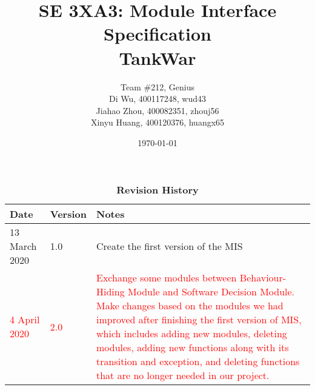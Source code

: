 \documentclass[12pt, titlepage]{article}
\title{SE 3XA3: Module Interface Specification\\TankWar}
\author{Team \#212, Genius
		\\Di Wu, 400117248, wud43 
		\\Jiahao Zhou, 400082351, zhouj56 
		\\Xinyu Huang, 400120376, huangx65
}
\date{\today}
\begin{document}
\maketitle

\tableofcontents
\listoftables
\listoffigures

\begin{table}[bp]
\caption{\bf Revision History}
\begin{tabularx}{\textwidth}{p{3cm}p{2cm}X}
\toprule {\bf Date} & {\bf Version} & {\bf Notes}\\
\midrule
13 March 2020 & 1.0 & Create the first version of the MIS\\
\textcolor{red}{4 April 2020} & \textcolor{red}{2.0} & \textcolor{red}{Exchange some modules between Behaviour-Hiding Module and Software Decision Module. Make changes based on the modules we had improved after finishing the first version of MIS, which includes adding new modules, deleting modules, adding new functions along with its transition and exception, and deleting functions that are no longer needed in our project. }\\
\bottomrule
\end{tabularx}
\end{table}

\newpage
\end{document}

